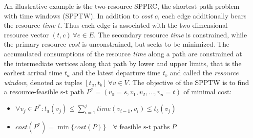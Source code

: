 \begin{definition}[SPPTW]
An illustrative example is the two-resource SPPRC, the shortest path problem with time windows (SPPTW). In addition to \textit{cost} $c$, each edge additionally bears the resource \textit{time} $t$. Thus each edge is associated with the two-dimensional resource vector $(t,c) \, \forall e \in E$. The secondary resource \textit{time} is constrained, while the primary resource \textit{cost} is unconstrained, but seeks to be minimized. The accumulated consumptions of the resource \textit{time} along a path are constrained at the intermediate vertices along that path by lower and upper limits, that is the earliest arrival time $t_a$ and the latest departure time $t_b$ and called the \textit{resource window}, denoted as tuples $[t_a,t_b] \, \forall v \in V$. The objective of the SPPTW is to find a resource-feasible s-t path $P^*=(v_0=s,v_1,v_2,\dots,v_n=t)$ of minimal cost: 
\begin{itemize}
	\item $\forall v_j \in P^*: t_a(v_j) \leq \sum_{i=1}^{j}{time(v_{i-1},v_{i})} \leq t_b(v_j)$
	\item $cost(P^*) = \min\{cost(P)\} \quad \forall \; \text{feasible s-t paths} \; P$ %
\end{itemize}
\end{definition}



